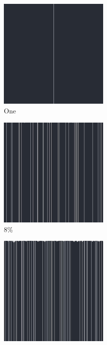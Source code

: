\documentclass[12pt, fleqn]{report}                             %
\theoremstyle{break}                                            %
\begin{document}
      \begin{figure}[ht!]
        \centering
        \begin{subfigure}[b]{0.4\linewidth}
          \includegraphics[width=0.6\textwidth]{Images/164/a.png}
          \caption{One}
        \end{subfigure}
        \begin{subfigure}[b]{0.4\linewidth}
          \includegraphics[width=0.6\textwidth]{Images/164/b.png}
          \caption{8\%}
        \end{subfigure}
        \begin{subfigure}[b]{0.4\linewidth}
          \includegraphics[width=0.6\textwidth]{Images/164/c.png}

\end{subfigure}
\end{figure}
\end{document}
